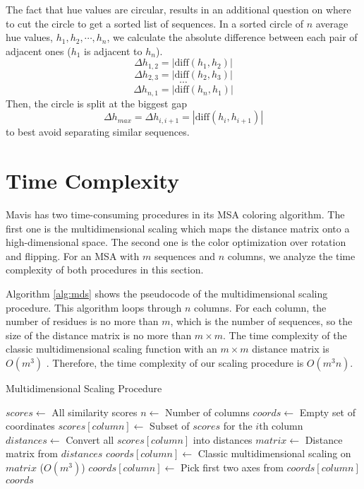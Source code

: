 The fact that hue values are circular, results in an additional question on where to cut the circle to get a sorted list of sequences. In a sorted circle of $n$ average hue values, $h_1,h_2,\cdots,h_n$, we calculate the absolute difference between each pair of adjacent ones ($h_1$ is adjacent to $h_n$). $$\Delta h_{1,2}=|\mathrm{diff}(h_1,h_2)|$$ $$\Delta h_{2,3}=|\mathrm{diff}(h_2,h_3)|$$ $$\cdots$$ $$\Delta h_{n,1}=|\mathrm{diff}(h_n,h_1)|$$ Then, the circle is split at the biggest gap $$\Delta h_{max}=\Delta h_{i,i+1}=|\mathrm{diff}(h_i,h_{i+1})|$$ to best avoid separating similar sequences.

\section{Time Complexity}

Mavis has two time-consuming procedures in its MSA coloring algorithm. The first one is the multidimensional scaling which maps the distance matrix onto a high-dimensional space. The second one is the color optimization over rotation and flipping. For an MSA with $m$ sequences and $n$ columns, we analyze the time complexity of both procedures in this section.

Algorithm \ref{alg:mds} shows the pseudocode of the multidimensional scaling procedure. This algorithm loops through $n$ columns. For each column, the number of residues is no more than $m$, which is the number of sequences, so the size of the distance matrix is no more than $m\times m$. The time complexity of the classic multidimensional scaling function with an $m\times m$ distance matrix is $O(m^3)$ \cite{Tzeng:2008qy}. Therefore, the time complexity of our scaling procedure is $O(m^3n)$.

\begin{algorithm}
\caption{Multidimensional Scaling Procedure}
\label{alg:mds}
\begin{algorithmic}
  \STATE $scores \gets$ All similarity scores
  \STATE $n \gets$ Number of columns
  \STATE $coords \gets$ Empty set of coordinates
    \STATE $scores[column] \gets$ Subset of $scores$ for the $i$th column
    \STATE $distances \gets$ Convert all $scores[column]$ into distances
    \STATE $matrix \gets$ Distance matrix from $distances$
    \STATE $coords[column] \gets$ Classic multidimensional scaling on $matrix$ ($O(m^3)$)
    \STATE $coords[column] \gets$ Pick first two axes from $coords[column]$
  \ENDFOR
  \RETURN $coords$
\end{algorithmic}
\end{algorithm}

